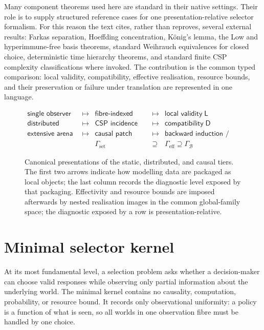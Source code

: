 \documentclass[11pt]{article}
\theoremstyle{plain}
\theoremstyle{definition}
\theoremstyle{remark}
\begin{document}
Many component theorems used here are standard in their native settings. Their
role is to supply structured reference cases for one presentation-relative
selector formalism. For this reason the text cites, rather than reproves, several
external results: Farkas separation, Hoeffding concentration, König's lemma, the
Low and hyperimmune-free basis theorems, standard Weihrauch equivalences for
closed choice, deterministic time hierarchy theorems, and standard finite CSP
complexity classifications where invoked. The contribution is the common typed
comparison: local validity, compatibility, effective realisation, resource
bounds, and their preservation or failure under translation are represented in
one language.

\begin{figure}[htbp]
\centering
\[
\begin{array}{rclcl}
\textsf{single observer}
&\longmapsto&
\textsf{fibre-indexed selector}
&\longmapsto&
\textsf{local validity}\;\mathsf L
\\[1mm]
\textsf{distributed observers}
&\longmapsto&
\textsf{CSP incidence diagram}
&\longmapsto&
\textsf{compatibility}\;\mathsf D
\\[1mm]
\textsf{extensive arena}
&\longmapsto&
\textsf{causal patch sheaf}
&\longmapsto&
\textsf{backward induction / matching}
\\[2mm]
&&
\Gamma_{\mathrm{set}}
&\supseteq&
\Gamma_{\mathrm{eff}}\supseteq\Gamma_{\mathcal B}
\end{array}
\]
\caption{Canonical presentations of the static, distributed, and causal tiers.
The first two arrows indicate how modelling data are packaged as local objects;
the last column records the diagnostic level exposed by that packaging.
Effectivity and resource bounds are imposed afterwards by nested realisation
images in the common global-family space; the diagnostic exposed by a row is
presentation-relative.}
\label{fig:architecture}
\end{figure}

\section{Minimal selector kernel}\label{sec:kernel}

At its most fundamental level, a selection problem asks whether a
decision-maker can choose valid responses while observing only partial
information about the underlying world. The minimal kernel contains no causality,
computation, probability, or resource bound. It records only observational
uniformity: a policy is a function of what is seen, so all worlds in one
observation fibre must be handled by one choice.
\end{document}
